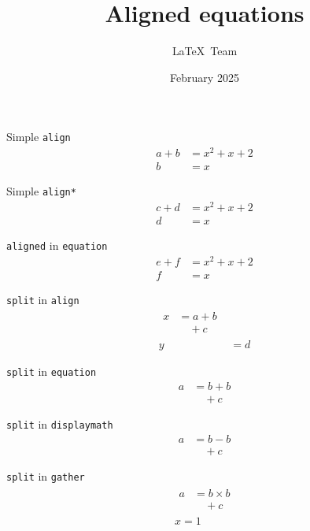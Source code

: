 
\usepackage{unicode-math}
\usepackage{parskip}

\usepackage{unicode-math}

\title{Aligned equations}
\author{\LaTeX\ Team}
\date{February 2025}

\addtolength\textheight{6cm}
\addtolength\topmargin{-4cm}


\maketitle



Simple \texttt{align}
\begin{align}
  a+b&=x^2+x+2\\
    b&=x
\end{align}



Simple \texttt{align*}
\begin{align*}
  c+d&=x^2+x+2\\
    d&=x
\end{align*}


\texttt{aligned} in \texttt{equation}
\begin{equation}
\begin{aligned}
  e+f&=x^2+x+2\\
    f&=x
\end{aligned}
\end{equation}

\texttt{split} in \texttt{align}
\begin{align}
\begin{split}
  x&= a  +  b\\
   &\quad + c
\end{split}\\
  y&=d
\end{align}

\texttt{split} in \texttt{equation}
\begin{equation}
\begin{split}
 a & = b+b\\
   &\quad + c
\end{split} 
\end{equation}

\texttt{split} in \texttt{displaymath}
\[
\begin{split}
 a & = b-b\\
   &\quad + c
\end{split} 
\]

\texttt{split} in \texttt{gather} 
\begin{gather}
\begin{split}
 a & = b\times b\\
   &\quad + c
\end{split}\\
x=1
\end{gather}


